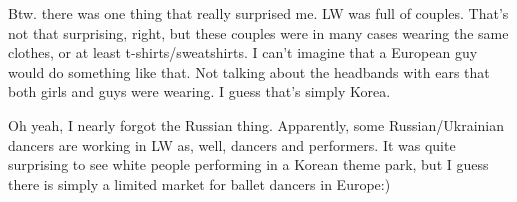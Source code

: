 \begin{post}
\begin{content}
Btw. there was one thing that really surprised me. LW was full of couples. That's not that surprising, right, but these couples were in many cases wearing the same clothes, or at least t-shirts/sweatshirts. I can't imagine that a European guy would do something like that. Not talking about the headbands with ears that both girls and guys were wearing. I guess that's simply Korea.

\begin{figure}
\vspace{-12pt}\centering{}
\vspace{-24pt}
\end{figure}Oh yeah, I nearly forgot the Russian thing. Apparently, some Russian/Ukrainian dancers are working in LW as, well, dancers and performers. It was quite surprising to see white people performing in a Korean theme park, but I guess there is simply a limited market for ballet dancers in Europe:)

	\end{content}
\end{post}

